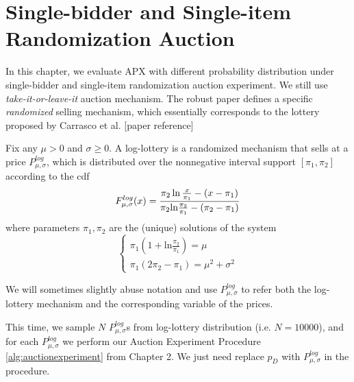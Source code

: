\chapter{Single-bidder and Single-item Randomization Auction}
\label{ch:APX}
In this chapter, we evaluate APX with different probability distribution under single-bidder and single-item randomization auction experiment. We still use \textit{take-it-or-leave-it} auction mechanism. The robust paper defines a specific \textit{randomized} selling mechanism, which essentially corresponds to the lottery proposed by Carrasco et al. [paper reference]
\begin{definition}
	\label{definition:loglottery}
	Fix any $\mu > 0$ and $\sigma \geqslant 0$. A log-lottery is a randomized mechanism that sells at a price $P^{log}_{\mu,\sigma}$, which is distributed over the nonnegative interval support $[\pi_1, \pi_2]$ according to the cdf
	\begin{equation}\notag
		F^{log}_{\mu,\sigma} (x) =  \frac{\pi_2 \ln\frac{x}{\pi_1} -(x - \pi_1)}{\pi_2 \text{ln} \frac{\pi_2}{\pi_1} - (\pi_2-\pi_1)}
	\end{equation}
	where parameters $\pi_1,\pi_2$ are the (unique) solutions of the system
	\begin{equation}
		\begin{cases} \pi_1 (1 + \text{ln}\frac{\pi_2}{\pi_1}) = \mu   \\    \pi_1(2\pi_2 - \pi_1) = \mu^2 + \sigma^2  \end{cases}
	\end{equation}
\end{definition}
We will sometimes slightly abuse notation and use $P^{log}_{\mu,\sigma}$ to refer both the log-lottery mechanism and the corresponding variable of the prices.

This time, we sample $N$ $P^{log}_{\mu,\sigma}$s from log-lottery distribution (i.e. $N = 10000$), and for each $P^{log}_{\mu,\sigma}$ we perform our Auction Experiment Procedure \ref{alg:auctionexperiment} from Chapter 2. We just need replace $p_D$ with $P^{log}_{\mu,\sigma}$ in the procedure. 
